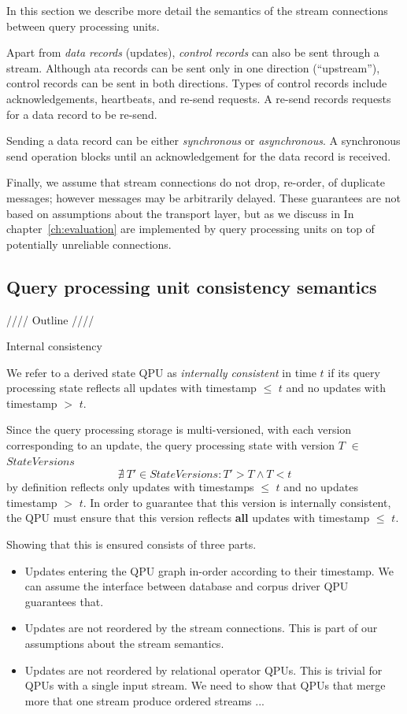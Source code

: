 In this section we describe more detail the semantics of the stream connections between query processing units.

\medskip
\noindent
Apart from \textit{data records} (updates), \textit{control records} can also be sent through a stream.
Although ata records can be sent only in one direction (``upstream''), control records can be sent in both directions.
Types of control records include acknowledgements, heartbeats, and re-send requests.
A re-send records requests for a data record to be re-send.

\medskip
\noindent
Sending a data record can be either \textit{synchronous} or \textit{asynchronous}.
A synchronous send operation blocks until an acknowledgement for the data record is received.

\medskip
\noindent
Finally, we assume that stream connections do not drop, re-order, of duplicate messages;
however messages may be arbitrarily delayed.
These guarantees are not based on assumptions about the transport layer, but as we discuss in In chapter~\ref{ch:evaluation}
are implemented by query processing units on top of potentially unreliable connections.


\subsection{Query processing unit consistency semantics}

//// Outline ////

\noindent
Internal consistency

\noindent
We refer to a derived state QPU as \textit{internally consistent} in time $t$ if its query processing state
reflects all updates with timestamp $\leq$ $t$ and no updates with timestamp $>$ $t$.

Since the query processing storage is multi-versioned, with each version corresponding to an update,
the query processing state with version $T$ $\in$ $StateVersions$
\[
  \nexists~T' \in StateVersions : T' > T \land T < t
\]
by definition reflects only updates with timestamps $\leq$ $t$ and no updates timestamp $>$ $t$.
In order to guarantee that this version is internally consistent, the QPU must ensure that this version reflects
\textbf{all} updates with timestamp $\leq$ $t$.

Showing that this is ensured consists of three parts.
\begin{itemize}
  \item Updates entering the QPU graph in-order according to their timestamp.
  We can assume the interface between database and corpus driver QPU guarantees that.
  \item Updates are not reordered by the stream connections.
  This is part of our assumptions about the stream semantics.
  \item Updates are not reordered by relational operator QPUs.
  This is trivial for QPUs with a single input stream.
  We need to show that QPUs that merge more that one stream produce ordered streams ...
\end{itemize}

